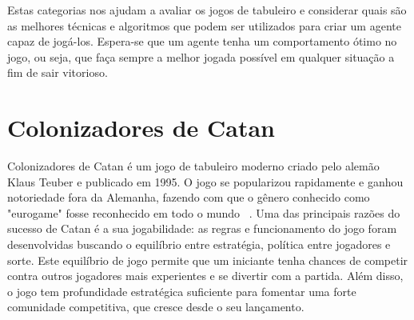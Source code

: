 Estas categorias nos ajudam a avaliar os jogos de tabuleiro e considerar quais são as melhores técnicas e algoritmos que podem ser utilizados para criar um agente capaz de jogá-los. Espera-se que um agente tenha um comportamento ótimo no jogo, ou seja, que faça sempre a melhor jogada possível em qualquer situação a fim de sair vitorioso.



   
   


\section{\label{sec:secao2}Colonizadores de Catan}

Colonizadores de Catan é um jogo de tabuleiro moderno criado pelo alemão Klaus Teuber e publicado em 1995. O jogo se popularizou rapidamente e ganhou notoriedade fora da Alemanha, fazendo com que o gênero conhecido como "eurogame" fosse reconhecido em todo o mundo ~\cite{MONTECARLOCATAN01}. Uma das principais razões do sucesso de Catan é a sua jogabilidade: as regras e funcionamento do jogo foram desenvolvidas buscando o equilíbrio entre estratégia, política entre jogadores e sorte. Este equilíbrio de jogo permite que um iniciante tenha chances de competir contra outros jogadores mais experientes e se divertir com a partida. Além disso, o jogo tem profundidade estratégica suficiente para fomentar uma forte comunidade competitiva, que cresce desde o seu lançamento.

